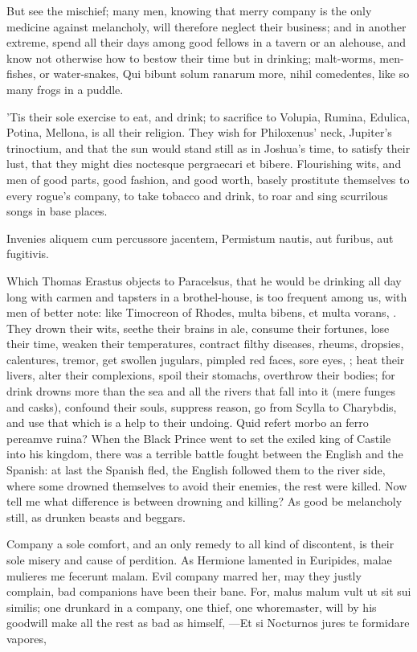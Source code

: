 {But see the mischief; many men, knowing that merry company is the only
medicine against melancholy, will therefore neglect their business; and
in another extreme, spend all their days among good fellows in a tavern
or an alehouse, and know not otherwise how to bestow their time but in
drinking; malt-worms, men-fishes, or water-snakes, Qui bibunt
solum ranarum more, nihil comedentes, like so many frogs in a puddle.

'Tis their sole exercise to eat, and drink; to sacrifice to Volupia,
Rumina, Edulica, Potina, Mellona, is all their religion. They wish for
Philoxenus' neck, Jupiter's trinoctium, and that the sun would stand
still as in Joshua's time, to satisfy their lust, that they might dies
noctesque pergraecari et bibere. Flourishing wits, and men of good
parts, good fashion, and good worth, basely prostitute themselves to
every rogue's company, to take tobacco and drink, to roar and sing
scurrilous songs in base places.

Invenies aliquem cum percussore jacentem,
Permistum nautis, aut furibus, aut fugitivis.

Which Thomas Erastus objects to Paracelsus, that he would be drinking
all day long with carmen and tapsters in a brothel-house, is too
frequent among us, with men of better note: like Timocreon of Rhodes,
multa bibens, et multa vorans, \etc{}. They drown their wits, seethe their
brains in ale, consume their fortunes, lose their time, weaken their
temperatures, contract filthy diseases, rheums, dropsies, calentures,
tremor, get swollen jugulars, pimpled red faces, sore eyes, \etc{}; heat
their livers, alter their complexions, spoil their stomachs, overthrow
their bodies; for drink drowns more than the sea and all the rivers
that fall into it (mere funges and casks), confound their souls,
suppress reason, go from Scylla to Charybdis, and use that which is a
help to their undoing. Quid refert morbo an ferro pereamve ruina?
When the Black Prince went to set the exiled king of Castile into
his kingdom, there was a terrible battle fought between the English and
the Spanish: at last the Spanish fled, the English followed them to the
river side, where some drowned themselves to avoid their enemies, the
rest were killed. Now tell me what difference is between drowning and
killing? As good be melancholy still, as drunken beasts and beggars.

Company a sole comfort, and an only remedy to all kind of discontent,
is their sole misery and cause of perdition. As Hermione lamented in
Euripides, malae mulieres me fecerunt malam. Evil company marred her,
may they justly complain, bad companions have been their bane. For,
malus malum vult ut sit sui similis; one drunkard in a company,
one thief, one whoremaster, will by his goodwill make all the rest as
bad as himself,
---Et si
Nocturnos jures te formidare vapores,

}
